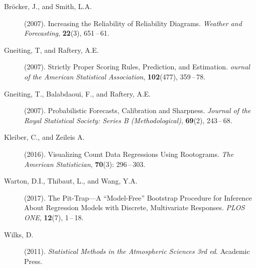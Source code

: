 \documentclass[twoside]{report}
\begin{document}






\begin{description}
\item [Bröcker, J., and Smith, L.A.] (2007).
    Increasing the Reliability of Reliability Diagrams.
    {\it Weather and Forecasting},
    {\bf 22}(3), 651\,--\,61.
\item[Gneiting, T, and Raftery, A.E.] (2007).
    Strictly Proper Scoring Rules, Prediction, and Estimation.
    {\it ournal of the American Statistical Association},
    {\bf 102}(477), 359\,--\,78.
\item[Gneiting, T., Balabdaoui, F., and Raftery, A.E.] (2007).
    Probabilistic Forecasts, Calibration and Sharpness.
    {\it Journal of the Royal Statistical Society: Series B (Methodological)},
    {\bf 69}(2), 243\,--\,68.
\item [Kleiber, C., and Zeileis A.] (2016).
    Visualizing Count Data Regressions Using Rootograms.
    {\it The American Statistician},
    {\bf 70}(3): 296\,--\,303.
\item [Warton, D.I., Thibaut, L., and Wang, Y.A.] (2017).
    The Pit-Trap---{A} ``Model-Free'' Bootstrap Procedure for Inference About
    Regression Models with Discrete, Multivariate Responses.
    {\it PLOS ONE},
    {\bf 12}(7), 1\,--\,18.
\item [Wilks, D.] (2011).
    {\it Statistical Methods in the Atmospheric Sciences 3rd ed}.
    Academic Press.
\end{description}
\end{document}
